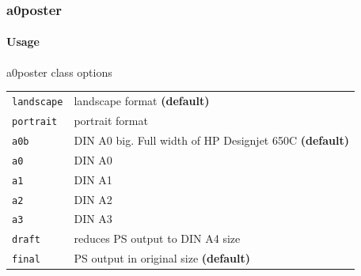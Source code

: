 \documentclass[11pt]{beamer}
\begin{document}
\begin{frame}
\frametitle{a0poster}\framesubtitle{Usage}
		\begin{block}{a0poster class options}
		\footnotesize
			\begin{tabular}{l l}
				\verb|landscape| & landscape format \textbf{(default)}\\
				\verb|portrait| & portrait format\\
				\verb|a0b| & DIN A0 big. Full width of HP Designjet 650C \textbf{(default)}\\
				\verb|a0| & DIN A0\\
				\verb|a1| & DIN A1\\
				\verb|a2| & DIN A2\\
				\verb|a3| & DIN A3\\
				\verb|draft| & reduces PS output to DIN A4 size\\
				\verb|final| & PS output in original size \textbf{(default)}\\
			\end{tabular}
		\normalsize
			
		\end{block}		
		
\end{frame}
\end{document}

